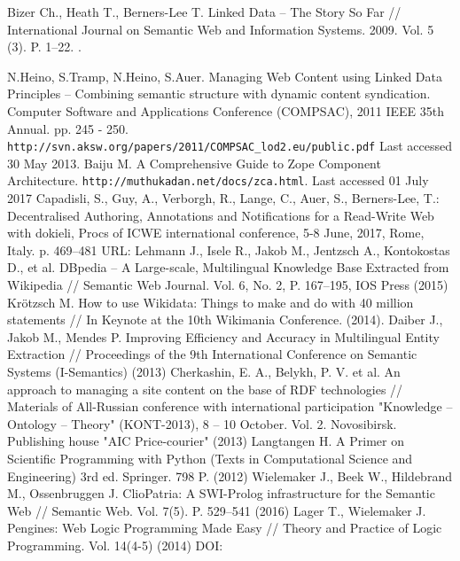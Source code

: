\documentclass[conference,a4paper]{IEEEtran}
\providecommand\url[1]{\texttt{#1}}
\begin{document}
\begin{thebibliography}{99}
 Bizer Ch., Heath T., Berners-Lee T. Linked Data -- The Story So
  Far // International Journal on Semantic Web and Information Systems.
  2009. Vol. 5 (3). P. 1--22. .

 N.Heino, S.Tramp, N.Heino, S.Auer. Managing Web Content using Linked Data Principles – Combining semantic structure with dynamic content syndication. Computer Software and Applications Conference (COMPSAC), 2011 IEEE 35th Annual. pp. 245 - 250.  \url{http://svn.aksw.org/papers/2011/COMPSAC_lod2.eu/public.pdf}  Last accessed 30 May 2013.
  Baiju M. A Comprehensive Guide to Zope Component Architecture.
\url{http://muthukadan.net/docs/zca.html}. Last accessed 01 July 2017
  Capadisli, S., Guy, A., Verborgh, R., Lange, C., Auer, S., Berners-Lee, T.: Decentralised Authoring, Annotations and Notifications for a Read-Write Web with dokieli, Procs of ICWE international conference, 5-8 June, 2017, Rome, Italy. p. 469--481 URL: 
  Lehmann J., Isele R., Jakob M., Jentzsch A., Kontokostas D., et al.
  DBpedia -- A Large-scale, Multilingual Knowledge Base Extracted from
  Wikipedia // Semantic Web Journal. Vol. 6, No. 2, P. 167--195,
  IOS Press (2015)
  Krötzsch M. How to use Wikidata: Things to make and do with 40 million
  statements // In Keynote at the 10th Wikimania Conference. (2014).
  Daiber J., Jakob M., Mendes P. Improving Efficiency and Accuracy in
  Multilingual Entity Extraction // Proceedings of the 9th International
  Conference on Semantic Systems (I-Semantics) (2013)
  Cherkashin, E. A., Belykh, P. V. et al. An approach to managing a site
  content on the base of RDF technologies // Materials of All-Russian
  conference with international participation "Knowledge -- Ontology --
  Theory" (KONT-2013), 8 -- 10 October. Vol. 2. Novosibirsk.
  Publishing house "AIC Price-courier" (2013)
  Langtangen H. A Primer on Scientific Programming with Python (Texts in
  Computational Science and Engineering) 3rd ed. Springer. 798 P. (2012)
  Wielemaker J., Beek W., Hildebrand M., Ossenbruggen J. ClioPatria: A
  SWI-Prolog infrastructure for the Semantic Web // Semantic Web.
  Vol. 7(5). P. 529--541 (2016) 
  Lager T., Wielemaker J. Pengines: Web Logic Programming Made Easy //
  Theory and Practice of Logic Programming. Vol. 14(4-5) (2014)
DOI: 

\end{thebibliography}
\end{document}
